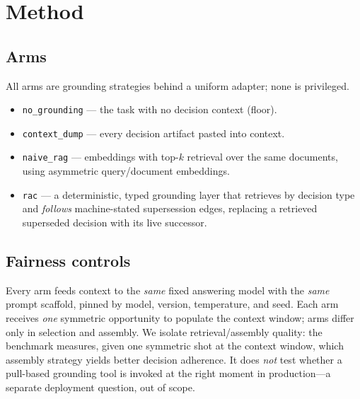 \section{Method}

\subsection{Arms}
All arms are grounding strategies behind a uniform adapter; none is privileged.
\begin{itemize}
  \item \texttt{no\_grounding} --- the task with no decision context (floor).
  \item \texttt{context\_dump} --- every decision artifact pasted into context.
  \item \texttt{naive\_rag} --- embeddings with top-$k$ retrieval over the same
        documents, using asymmetric query/document embeddings.
  \item \texttt{rac} --- a deterministic, typed grounding layer that retrieves by
        decision type and \emph{follows} machine-stated supersession edges,
        replacing a retrieved superseded decision with its live successor.
\end{itemize}

\subsection{Fairness controls}
Every arm feeds context to the \emph{same} fixed answering model with the
\emph{same} prompt scaffold, pinned by model, version, temperature, and seed.
Each arm receives \emph{one} symmetric opportunity to populate the context window;
arms differ only in selection and assembly. We isolate retrieval/assembly quality:
the benchmark measures, given one symmetric shot at the context window, which
assembly strategy yields better decision adherence. It does \emph{not} test
whether a pull-based grounding tool is invoked at the right moment in
production---a separate deployment question, out of scope.

